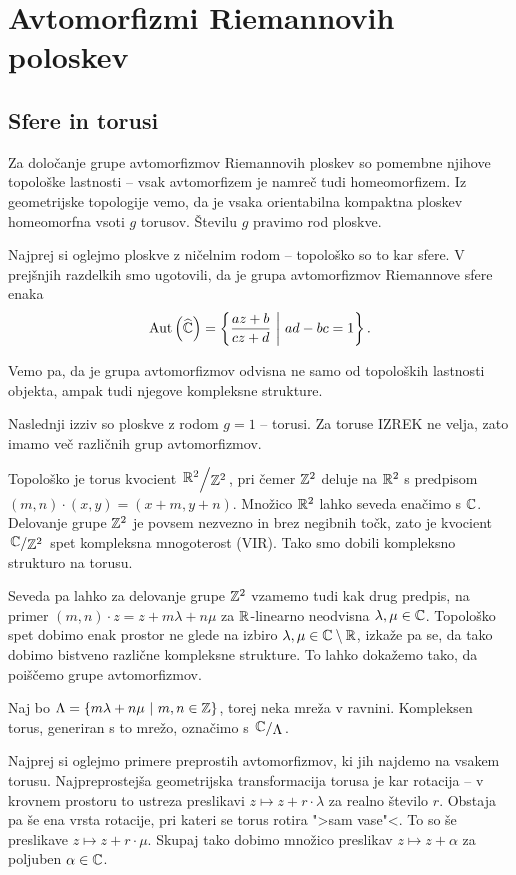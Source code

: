 \section{Avtomorfizmi Riemannovih poloskev}

\subsection{Sfere in torusi}

Za določanje grupe avtomorfizmov Riemannovih ploskev so pomembne
njihove topološke lastnosti -- vsak avtomorfizem je namreč tudi
homeomorfizem. Iz geometrijske topologije vemo, da je vsaka
orientabilna kompaktna ploskev homeomorfna vsoti $g$ torusov.
Številu $g$ pravimo rod ploskve.

Najprej si oglejmo ploskve z ničelnim rodom -- topološko so to kar
sfere. V prejšnjih razdelkih smo ugotovili, da je grupa
avtomorfizmov Riemannove sfere enaka
\[
\operatorname{Aut} \left(\widehat{\mathbb{C}}\right) = \left\{\frac{az + b}{cz + d}~\middle\vert~ad - bc = 1\right\}.
\]

Vemo pa, da je grupa avtomorfizmov odvisna ne samo od topoloških
lastnosti objekta, ampak tudi njegove kompleksne strukture.

Naslednji izziv so ploskve z rodom $g=1$ -- torusi. Za toruse
IZREK ne velja, zato imamo več različnih grup avtomorfizmov.

Topološko je torus kvocient $\kvoc{\R^2}{\Z^2}$, pri čemer $\mathbb{Z}^2$
deluje na $\mathbb{R}^2$ s predpisom $(m,n) \cdot (x,y) = (x+m, y+n)$.
Množico $\mathbb{R}^2$ lahko seveda enačimo s $\mathbb{C}$. Delovanje grupe $\mathbb{Z}^2$
je povsem nezvezno in brez negibnih točk, zato je kvocient
$\kvoc{\C}{\Z^2}$ spet kompleksna mnogoterost (VIR). Tako smo
dobili kompleksno strukturo na torusu.

Seveda pa lahko za delovanje grupe $\mathbb{Z}^2$ vzamemo tudi kak drug
predpis, na primer $(m,n) \cdot z = z + m \lambda+ n \mu$ za
$\mathbb{R}$-linearno neodvisna $\lambda, \mu \in \mathbb{C}$. Topološko spet
dobimo enak prostor ne glede na izbiro
$\lambda, \mu \in \mathbb{C} \setminus \mathbb{R}$, izkaže pa se, da tako dobimo
bistveno različne kompleksne strukture. To lahko dokažemo tako, da
poiščemo grupe avtomorfizmov.

Naj bo $\Lambda = \left\{m \lambda + n \mu~\middle\vert~m, n \in \mathbb{Z}\right\}$, torej
neka mreža v ravnini. Kompleksen torus, generiran s to mrežo,
označimo s $\kvoc{\C}{\Lambda}$.

Najprej si oglejmo primere preprostih avtomorfizmov, ki jih najdemo
na vsakem torusu. Najpreprostejša geometrijska transformacija
torusa je kar rotacija -- v krovnem prostoru to ustreza preslikavi
$z \mapsto z + r \cdot \lambda$ za realno število $r$. Obstaja pa
še ena vrsta rotacije, pri kateri se torus rotira ">sam vase"<.
To so še preslikave $z \mapsto z + r \cdot \mu$. Skupaj tako dobimo
množico preslikav $z \mapsto z + \alpha$ za poljuben
$\alpha \in \mathbb{C}$.

